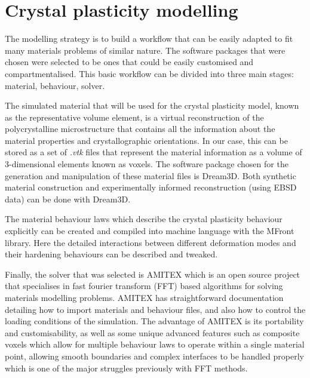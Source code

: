\section{Crystal plasticity modelling}
The modelling strategy is to build a workflow that can be easily adapted to fit many materials problems of similar nature.
The software packages that were chosen were selected to be ones that could be easily customised and compartmentalised.
This basic workflow can be divided into three main stages: material, behaviour, solver.

The simulated material that will be used for the crystal plasticity model, known as the representative volume element, is a virtual reconstruction of the polycrystalline microstructure that contains all the information about the material properties and crystallographic orientations.
In our case, this can be stored as a set of \textit{.vtk} files that represent the material information as a volume of 3-dimensional elements known as voxels.
The software package chosen for the generation and manipulation of these material files is Dream3D.
Both synthetic material construction and experimentally informed reconstruction (using EBSD data) can be done with Dream3D.

The material behaviour laws which describe the crystal plasticity behaviour explicitly can be created and compiled into machine language with the MFront library.
Here the detailed interactions between different deformation modes and their hardening behaviours can be described and tweaked.

Finally, the solver that was selected is AMITEX which is an open source project that specialises in fast fourier transform (FFT) based algorithms for solving materials modelling problems.
AMITEX has straightforward documentation detailing how to import materials and behaviour files, and also how to control the loading conditions of the simulation.
The advantage of AMITEX is its portability and customisability, as well as some unique advanced features such as composite voxels which allow for multiple behaviour laws to operate within a single material point, allowing smooth boundaries and complex interfaces to be handled properly which is one of the major struggles previously with FFT methods.